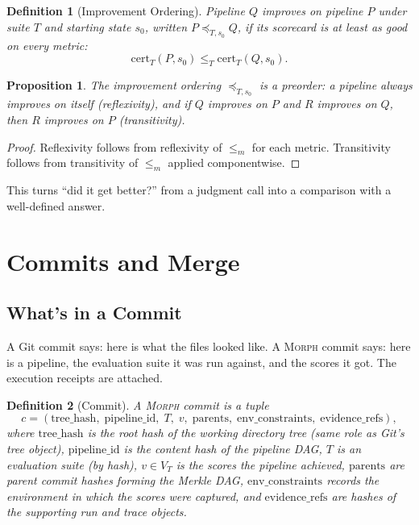 \documentclass{article}
\newtheorem{definition}{Definition}
\newtheorem{proposition}{Proposition}
\begin{document}
\begin{definition}[Improvement Ordering]
Pipeline $Q$ \emph{improves on} pipeline $P$ under suite $T$ and starting
state $s_0$, written $P \preceq_{T,s_0} Q$, if its scorecard is at least as
good on every metric:
\begin{equation}
  \text{cert}_T(P, s_0) \leq_T \text{cert}_T(Q, s_0).
\end{equation}
\end{definition}

\begin{proposition}
The improvement ordering $\preceq_{T,s_0}$ is a preorder: a pipeline always
improves on itself (reflexivity), and if $Q$ improves on $P$ and $R$ improves
on $Q$, then $R$ improves on $P$ (transitivity).
\end{proposition}
\begin{proof}
Reflexivity follows from reflexivity of $\leq_m$ for each metric. Transitivity
follows from transitivity of $\leq_m$ applied componentwise.
\end{proof}

\noindent This turns ``did it get better?'' from a judgment call into a
comparison with a well-defined answer.

\section{Commits and Merge}
\label{sec:merge}

\subsection{What's in a Commit}

A Git commit says: here is what the files looked like. A \textsc{Morph} commit
says: here is a pipeline, the evaluation suite it was run against, and the
scores it got. The execution receipts are attached.

\begin{definition}[Commit]
A \textsc{Morph} commit is a tuple
\begin{equation}
  c = (\text{tree\_hash},\; \text{pipeline\_id},\; T,\; v,\; \text{parents},\;
  \text{env\_constraints},\; \text{evidence\_refs}),
\end{equation}
where $\text{tree\_hash}$ is the root hash of the working directory tree (same
role as Git's tree object), $\text{pipeline\_id}$ is the content hash of the
pipeline DAG, $T$ is an evaluation suite (by hash), $v \in V_T$ is the scores
the pipeline achieved, $\text{parents}$ are parent commit hashes forming the
Merkle DAG, $\text{env\_constraints}$ records the environment in which the
scores were captured, and $\text{evidence\_refs}$ are hashes of the
supporting run and trace objects.
\end{definition}
\end{document}
